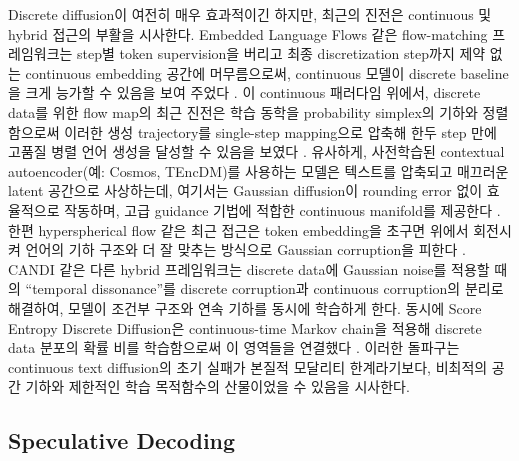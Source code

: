 \documentclass[11pt, a4paper, logo, copyright, gdm]{google}
\begin{document}
Discrete diffusion이 여전히 매우 효과적이긴 하지만, 최근의 진전은 continuous 및 hybrid 접근의 부활을 시사한다. Embedded Language Flows 같은 flow-matching 프레임워크는 step별 token supervision을 버리고 최종 discretization step까지 제약 없는 continuous embedding 공간에 머무름으로써, continuous 모델이 discrete baseline을 크게 능가할 수 있음을 보여 주었다 \citep{hu2026elf}. 이 continuous 패러다임 위에서, discrete data를 위한 flow map의 최근 진전은 학습 동학을 probability simplex의 기하와 정렬함으로써 이러한 생성 trajectory를 single-step mapping으로 압축해 한두 step 만에 고품질 병렬 언어 생성을 달성할 수 있음을 보였다 \citep{lee2026flowmap, potaptchik2026discrete}. 유사하게, 사전학습된 contextual autoencoder(예: Cosmos, TEncDM)를 사용하는 모델은 텍스트를 압축되고 매끄러운 latent 공간으로 사상하는데, 여기서는 Gaussian diffusion이 rounding error 없이 효율적으로 작동하며, 고급 guidance 기법에 적합한 continuous manifold를 제공한다 \citep{he2024manifold, meshchaninov2025cosmos, shabalin2025tencdm}. 한편 hyperspherical flow 같은 최근 접근은 token embedding을 초구면 위에서 회전시켜 언어의 기하 구조와 더 잘 맞추는 방식으로 Gaussian corruption을 피한다 \citep{deschenaux2026hyperspherical}. CANDI \citep{pynadath2025candi} 같은 다른 hybrid 프레임워크는 discrete data에 Gaussian noise를 적용할 때의 ``temporal dissonance''를 discrete corruption과 continuous corruption의 분리로 해결하여, 모델이 조건부 구조와 연속 기하를 동시에 학습하게 한다. 동시에 Score Entropy Discrete Diffusion은 continuous-time Markov chain을 적용해 discrete data 분포의 확률 비를 학습함으로써 이 영역들을 연결했다 \citep{lou2024discrete}. 이러한 돌파구는 continuous text diffusion의 초기 실패가 본질적 모달리티 한계라기보다, 비최적의 공간 기하와 제한적인 학습 목적함수의 산물이었을 수 있음을 시사한다.

\subsection{Speculative Decoding}
\end{document}
